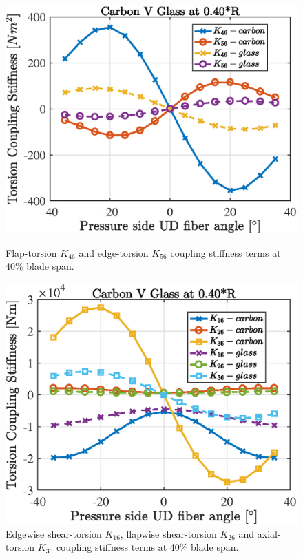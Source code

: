 \documentclass[a4paper]{jpconf}
\begin{document}
\begin{figure}[pth]
\centering
\begin{minipage}{0.45\textwidth}
\includegraphics[width=\linewidth]{Figures/Chapter4/Stiffness/CarbonVglass_flapVedgecoupl_40_eps.eps}
\caption{\label{subfig:carbonVglass_flapvedgetors_40}Flap-torsion $K_{46}$ and edge-torsion $K_{56}$ coupling stiffness terms at 40\% blade span.}
\end{minipage}\hspace{0.10\textwidth}%
\begin{minipage}{0.45\textwidth}
\includegraphics[width=\linewidth]{Figures/Chapter4/Stiffness/CarbonVglass_otherstiffcoupl_40_eps.eps}
\caption{\label{subfig:carbonVglass_otherstifftors_40}Edgewise shear-torsion $K_{16}$, flapwise shear-torsion $K_{26}$ and axial-torsion $K_{36}$ coupling stiffness terms at 40\% blade span.}
\end{minipage} 
\end{figure}
\end{document}

